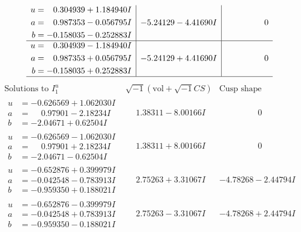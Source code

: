 \documentclass[1p]{elsarticle_modified}
\theoremstyle{definition}
\newcommand{\I}{\sqrt{-1}}
\begin{document}
$$\begin{array}{c|c|c}
\begin{aligned}
u &= \phantom{-}0.304939 + 1.184940 I \\
a &= \phantom{-}0.987353 - 0.056795 I \\
b &= -0.158035 - 0.252883 I\end{aligned}
 & -5.24129 - 4.41690 I & \phantom{-0.000000 } 0 \\ \hline\begin{aligned}
u &= \phantom{-}0.304939 - 1.184940 I \\
a &= \phantom{-}0.987353 + 0.056795 I \\
b &= -0.158035 + 0.252883 I\end{aligned}
 & -5.24129 + 4.41690 I & \phantom{-0.000000 } 0\\
 \hline 
 \end{array}$$\newpage$$\begin{array}{c|c|c}  
\text{Solutions to }I^u_{1}& \I (\text{vol} + \sqrt{-1}CS) & \text{Cusp shape}\\
 \hline 
\begin{aligned}
u &= -0.626569 + 1.062030 I \\
a &= \phantom{-}0.97901 - 2.18234 I \\
b &= -2.04671 + 0.62504 I\end{aligned}
 & \phantom{-}1.38311 - 8.00166 I & \phantom{-0.000000 } 0 \\ \hline\begin{aligned}
u &= -0.626569 - 1.062030 I \\
a &= \phantom{-}0.97901 + 2.18234 I \\
b &= -2.04671 - 0.62504 I\end{aligned}
 & \phantom{-}1.38311 + 8.00166 I & \phantom{-0.000000 } 0 \\ \hline\begin{aligned}
u &= -0.652876 + 0.399979 I \\
a &= -0.042548 - 0.783913 I \\
b &= -0.959350 + 0.188021 I\end{aligned}
 & \phantom{-}2.75263 + 3.31067 I & -4.78268 - 2.44794 I \\ \hline\begin{aligned}
u &= -0.652876 - 0.399979 I \\
a &= -0.042548 + 0.783913 I \\
b &= -0.959350 - 0.188021 I\end{aligned}
 & \phantom{-}2.75263 - 3.31067 I & -4.78268 + 2.44794 I \\ \hline\begin{aligned}

\end{aligned}
\end{array}$$
\end{document}
